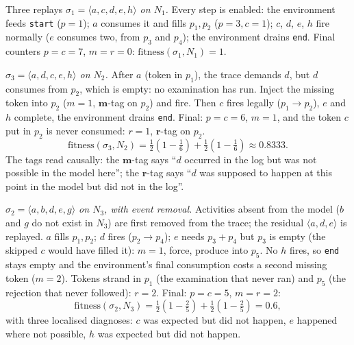 \begin{examplebox}{Three replays}
\emph{$\sigma_1 = \langle a,c,d,e,h \rangle$ on $N_1$.} Every step is enabled: the environment feeds \texttt{start} ($p{=}1$); $a$ consumes it and fills $p_1, p_2$ ($p{=}3, c{=}1$); $c$, $d$, $e$, $h$ fire normally ($e$ consumes two, from $p_3$ and $p_4$); the environment drains \texttt{end}. Final counters $p = c = 7$, $m = r = 0$: $\text{fitness}(\sigma_1, N_1) = 1$.
\par\smallskip
\emph{$\sigma_3 = \langle a,d,c,e,h \rangle$ on $N_2$.} After $a$ (token in $p_1$), the trace demands $d$, but $d$ consumes from $p_2$, which is empty: no examination has run. Inject the missing token into $p_2$ ($m{=}1$, $\mathbf{m}$-tag on $p_2$) and fire. Then $c$ fires legally ($p_1 \to p_2$), $e$ and $h$ complete, the environment drains \texttt{end}. Final: $p = c = 6$, $m = 1$, and the token $c$ put in $p_2$ is never consumed: $r = 1$, $\mathbf{r}$-tag on $p_2$.
$$\text{fitness}(\sigma_3, N_2) = \tfrac{1}{2}\!\left(1 - \tfrac{1}{6}\right) + \tfrac{1}{2}\!\left(1 - \tfrac{1}{6}\right) \approx 0.8333.$$
The tags read causally: the $\mathbf{m}$-tag says ``$d$ occurred in the log but was not possible in the model here''; the $\mathbf{r}$-tag says ``$d$ was supposed to happen at this point in the model but did not in the log''.
\par\smallskip
\emph{$\sigma_2 = \langle a,b,d,e,g \rangle$ on $N_3$, with event removal.} Activities absent from the model ($b$ and $g$ do not exist in $N_3$) are first removed from the trace; the residual $\langle a,d,e \rangle$ is replayed. $a$ fills $p_1, p_2$; $d$ fires ($p_2 \to p_4$); $e$ needs $p_3 + p_4$ but $p_3$ is empty (the skipped $c$ would have filled it): $m{=}1$, force, produce into $p_5$. No $h$ fires, so \texttt{end} stays empty and the environment's final consumption costs a second missing token ($m{=}2$). Tokens strand in $p_1$ (the examination that never ran) and $p_5$ (the rejection that never followed): $r = 2$. Final: $p = c = 5$, $m = r = 2$:
$$\text{fitness}(\sigma_2, N_3) = \tfrac{1}{2}\!\left(1 - \tfrac{2}{5}\right) + \tfrac{1}{2}\!\left(1 - \tfrac{2}{5}\right) = 0.6,$$
with three localised diagnoses: $c$ was expected but did not happen, $e$ happened where not possible, $h$ was expected but did not happen.
\end{examplebox}


